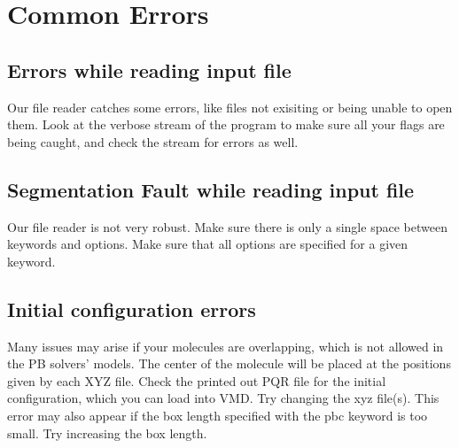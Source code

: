 \chapter{Common Errors}

\section{Errors while reading input file}
Our file reader catches some errors, like files not exisiting or
being unable to open them. Look at the verbose stream of the
program to make sure all your flags are being caught, and check the
stream for errors as well.

\section{Segmentation Fault while reading input file}
Our file reader is not very robust.
Make sure there is only a single space between keywords and options.
Make sure that all options are specified for a given keyword.

\section{Initial configuration errors}
Many issues may arise if your molecules are overlapping, which is not allowed in the PB solvers' models.
The center of the molecule will be placed at the positions given by each XYZ file.
Check the printed out PQR file for the initial configuration, which you can load into VMD.
Try changing the xyz file(s).
This error may also appear if the box length specified with the pbc keyword is too small.
Try increasing the box length.










